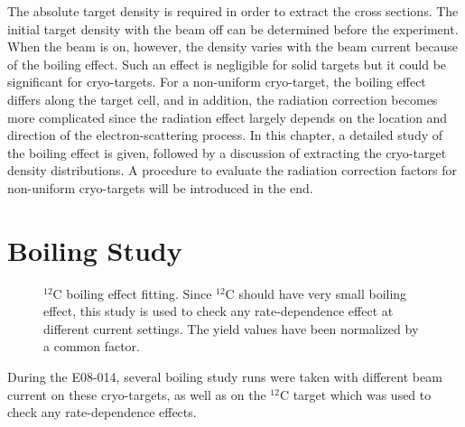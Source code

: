   The absolute target density is required in order to extract the cross sections. The initial target density with the beam off can be determined before the experiment. When the beam is on, however, the density varies with the beam current because of the boiling effect. Such an effect is negligible for solid targets but it could be significant for cryo-targets. For a non-uniform cryo-target, the boiling effect differs along the target cell, and in addition, the radiation correction becomes more complicated since the radiation effect largely depends on the location and direction of the electron-scattering process. In this chapter, a detailed study of the boiling effect is given, followed by a discussion of extracting the cryo-target density distributions. A procedure to evaluate the radiation correction factors for non-uniform cryo-targets will be introduced in the end.

\section{Boiling Study}
 \begin{figure}[!ht]
  \begin{center}
    \hfill
    \caption[$\mathrm{^{12}C}$ boiling effect fitting]{\footnotesize{$\mathrm{^{12}C}$ boiling effect fitting. Since $\mathrm{^{12}C}$ should have very small boiling effect, this study is used to check any rate-dependence effect at different current settings. The yield values have been normalized by a common factor.}}
    \label{c12_boil_fit}
  \end{center}
\end{figure}
  During the E08-014, several boiling study runs were taken with different beam current on these cryo-targets, as well as on the $\mathrm{^{12}C}$ target which was used to check any rate-dependence effects.
  
